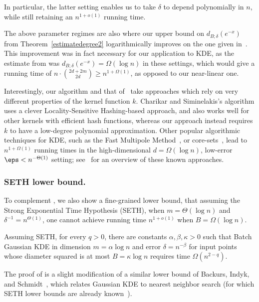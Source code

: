 In particular, the latter setting enables us to take $\delta$ to depend polynomially in $n$, while still retaining an $n^{1+o(1)}$ running time.

The above parameter regimes are also where our upper bound on $d_{B; \delta} (e^{-x})$ from Theorem~\ref{estimatedegree2} logarithmically improves on the one given in~\cite{sachdeva2014faster}. This improvement was in fact necessary for our application to KDE, as the estimate from \cite{sachdeva2014faster} was $d_{B; \delta} (e^{-x}) = \Omega (\log n)$ in these settings, which would give a running time of $n \cdot \binom{2d+2m}{2d} \geq n^{1 + \Omega(1)}$, as opposed to our near-linear one.


Interestingly, our algorithm and that of~\cite{charikar2017hashing} take approaches which rely on very different properties of the kernel function $k$. Charikar and Siminelakis's algorithm uses a clever Locality-Sensitive Hashing-based approach, and also works well for other kernels with efficient hash functions, whereas our approach instead requires $k$ to have a low-degree polynomial approximation. Other popular algorithmic techniques for KDE, such as the Fast Multipole Method~\cite{greengard1987fast}, or core-sets~\cite{agarwal2005geometric,phillips2013varepsilon}, lead to $n^{1 + \Omega(1)}$ running times in the high-dimensional $d = \Omega(\log n)$, low-error $\eps < n^{-\Theta(1)}$ setting; see~\cite[Section~1.3.2]{syminelakis2019fast} for an overview of these known approaches.  \\

 \subsubsection{SETH lower bound.}\label{subsec:2} To complement , we also show a fine-grained lower bound, that assuming the Strong Exponential Time Hypothesis (SETH), when $m = \Theta(\log n)$ and $\delta^{-1} = n^{\Theta(1)}$, one cannot achieve running time $n^{1+o(1)}$ when $B = \Omega(\log n)$.

\begin{proposition} \label{sethlb}
Assuming SETH, for every $q>0$, there are constants $\alpha, \beta, \kappa > 0$ such that Batch Gaussian KDE in dimension $m = \alpha \log n$ and error $\delta = n^{-\beta}$ for input points whose diameter squared is at most $B = \kappa \log n$ requires time $\Omega(n^{2-q})$.
\end{proposition}

The proof of  is a slight modification of a similar lower bound of Backurs, Indyk, and Schmidt~\cite{backurs2017fine}, which relates Gaussian KDE to nearest neighbor search (for which SETH lower bounds are already known~\cite{rubinstein2018hardness}). 

